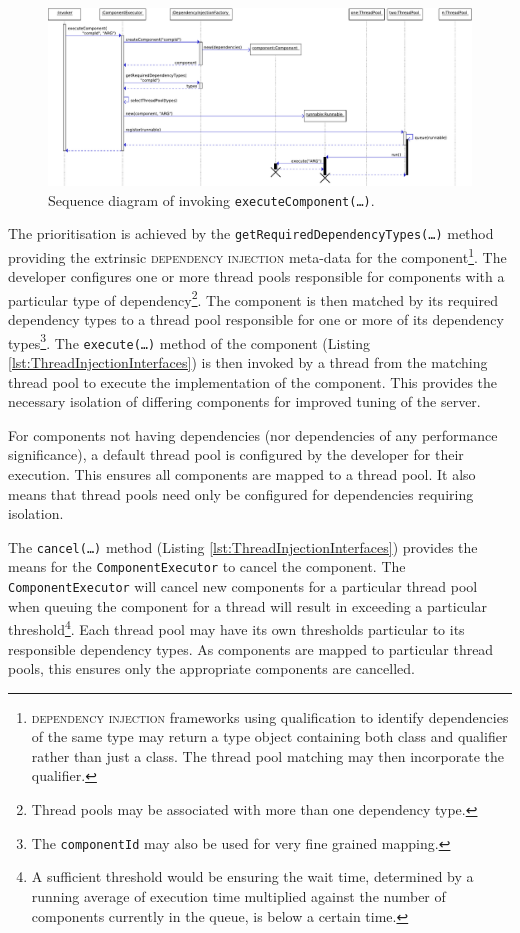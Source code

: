 \documentclass[prodmode]{style/acmlarge}
\begin{document}
\begin{figure}[!t]
\centering
\includegraphics[width=6in]{ExecuteComponentSequenceDiagram}
\caption{Sequence diagram of invoking \texttt{executeComponent(\ldots)}.}
\label{fig:ExecuteComponentSequenceDiagram}
\end{figure}

The prioritisation is achieved by the
\texttt{getRequiredDependencyTypes(\ldots)} method providing the extrinsic
\textsc{dependency injection} \cite{ioc} meta-data for the
component\footnote{\textsc{dependency injection} frameworks using qualification
to identify dependencies of the same type may return a type object containing
both class and qualifier rather than just a class.  The thread pool matching may
then incorporate the qualifier.}.  The developer configures one or more thread
pools responsible for components with a particular type of
dependency\footnote{Thread pools may be associated with more than one dependency
type.}.  The component is then matched by its required dependency types to a
thread pool responsible for one or more of its dependency types\footnote{The
\texttt{componentId} may also be used for very fine grained mapping.}.  The
\texttt{execute(\ldots)} method of the component (Listing
\ref{lst:ThreadInjectionInterfaces}) is then invoked by a thread from the
matching thread pool to execute the implementation of the component.
This provides the necessary isolation of differing components for improved
tuning of the server.

For components not having dependencies (nor dependencies of any
performance significance), a default thread pool is configured by the developer
for their execution.  This ensures all components are mapped to a
thread pool.  It also means that thread pools need only be configured for
dependencies requiring isolation.

The \texttt{cancel(\ldots)} method (Listing \ref{lst:ThreadInjectionInterfaces})
provides the means for the \texttt{ComponentExecutor} to cancel the component.
The \texttt{ComponentExecutor} will cancel new components for a particular
thread pool when queuing the component for a thread will result in exceeding a
particular threshold\footnote{A sufficient threshold would be ensuring the wait
time, determined by a running average of execution time multiplied against the
number of components currently in the queue, is below a certain time.}.  Each
thread pool may have its own thresholds particular to its responsible dependency
types.  As components are mapped to particular thread pools, this ensures only
the appropriate components are cancelled.
\end{document}
